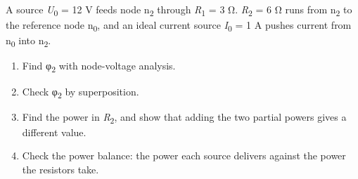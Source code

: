 \documentclass[11pt]{article}
\begin{document}
\begin{keepsection}
\begin{keepsection}
A source \textit{U}\textsubscript{0} = 12 V feeds node n\textsubscript{2} through \textit{R}\textsubscript{1} = 3 Ω. \textit{R}\textsubscript{2} = 6 Ω runs from n\textsubscript{2} to the reference node n\textsubscript{0}, and an ideal current source \textit{I}\textsubscript{0} = 1 A pushes current from n\textsubscript{0} into n\textsubscript{2}.

\begin{enumerate}
\item Find φ\textsubscript{2} with node-voltage analysis.
\item Check φ\textsubscript{2} by superposition.
\item Find the power in \textit{R}\textsubscript{2}, and show that adding the two partial powers gives a different value.
\item Check the power balance: the power each source delivers against the power the resistors take.
\end{enumerate}

\end{keepsection}
\end{keepsection}
\end{document}
